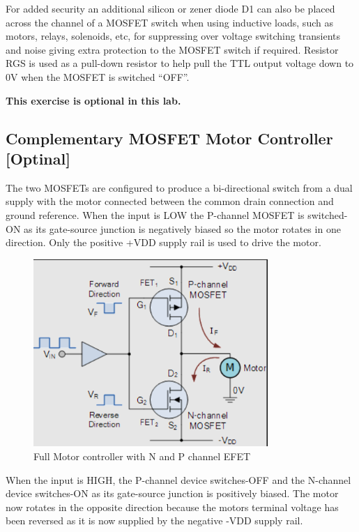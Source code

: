 For added security an additional silicon or zener diode D1 can also be placed across the channel of a MOSFET switch when using inductive loads, such as motors, relays, solenoids, etc, for suppressing over voltage switching transients and noise giving extra protection to the MOSFET switch if required. Resistor RGS is used as a pull-down resistor to help pull the TTL output voltage down to 0V when the MOSFET is switched “OFF”.

\textbf{This exercise is optional in this lab.}

\subsection{Complementary MOSFET Motor Controller [Optinal]}

The two MOSFETs are configured to produce a bi-directional switch from a dual supply with the motor connected between the common drain connection and ground reference. When the input is LOW the P-channel MOSFET is switched-ON as its gate-source junction is negatively biased so the motor rotates in one direction. Only the positive +VDD supply rail is used to drive the motor.

\begin{figure}[!htp]
    \centering
    \includegraphics[width = 3.5in]{source/picture/bai_6/fet_app_3.PNG}
    \caption{Full Motor controller with N and P channel EFET}
    \label{fet_app_3}
\end{figure}

When the input is HIGH, the P-channel device switches-OFF and the N-channel device switches-ON as its gate-source junction is positively biased. The motor now rotates in the opposite direction because the motors terminal voltage has been reversed as it is now supplied by the negative -VDD supply rail.\\

